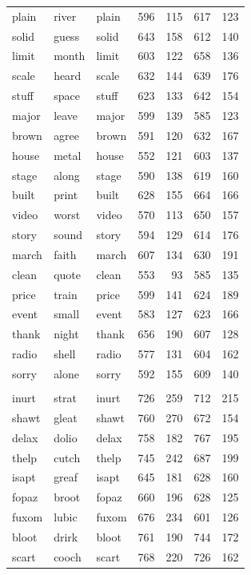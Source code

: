 \documentclass[
]{interact}
\begin{document}
\begin{longtable*}{lllrrrr}
plain & river & plain & 596 & 115 & 617 & 123 \\ 
solid & guess & solid & 643 & 158 & 612 & 140 \\ 
limit & month & limit & 603 & 122 & 658 & 136 \\ 
scale & heard & scale & 632 & 144 & 639 & 176 \\ 
stuff & space & stuff & 623 & 133 & 642 & 154 \\ 
major & leave & major & 599 & 139 & 585 & 123 \\ 
brown & agree & brown & 591 & 120 & 632 & 167 \\ 
house & metal & house & 552 & 121 & 603 & 137 \\ 
stage & along & stage & 590 & 138 & 619 & 160 \\ 
built & print & built & 628 & 155 & 664 & 166 \\ 
video & worst & video & 570 & 113 & 650 & 157 \\ 
story & sound & story & 594 & 129 & 614 & 176 \\ 
march & faith & march & 607 & 134 & 630 & 191 \\ 
clean & quote & clean & 553 & 93 & 585 & 135 \\ 
price & train & price & 599 & 141 & 624 & 189 \\ 
event & small & event & 583 & 127 & 623 & 166 \\ 
thank & night & thank & 656 & 190 & 607 & 128 \\ 
radio & shell & radio & 577 & 131 & 604 & 162 \\ 
sorry & alone & sorry & 592 & 155 & 609 & 140 \\ 
\midrule\addlinespace[2.5pt]
 \\ 
\midrule\addlinespace[2.5pt]
inurt & strat & inurt & 726 & 259 & 712 & 215 \\ 
shawt & gleat & shawt & 760 & 270 & 672 & 154 \\ 
delax & dolio & delax & 758 & 182 & 767 & 195 \\ 
thelp & cutch & thelp & 745 & 242 & 687 & 199 \\ 
isapt & greaf & isapt & 645 & 181 & 628 & 160 \\ 
fopaz & broot & fopaz & 660 & 196 & 628 & 125 \\ 
fuxom & lubic & fuxom & 676 & 234 & 601 & 126 \\ 
bloot & drirk & bloot & 761 & 190 & 744 & 172 \\ 
scart & cooch & scart & 768 & 220 & 726 & 162 \\ 

\end{longtable*}
\end{document}
